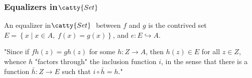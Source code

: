 \documentclass[]{article}
\newcommand{\setn}[1]{\left\{#1\right\}}
\newcommand{\tfarr}[4][\to]{\ensuremath{#2 : #3 #1 #4}}
\newcommand{\cat}[1]{\ensuremath{\!\! \catty{#1} \,\,}}
\begin{document}
\subsubsection{Equalizers in \cat{Set}}

An equalizer in \cat{Set} between $f$ and $g$ is the contrived set $E =
\setn{x\;|\; x \in A,\;f(x) = g(x)}$, and \tfarr[\hookrightarrow]{e}{E}{A}.

 "Since if $fh(z) = gh(z)$ for some
\tfarr{h}{Z}{A}, then $h(z) \in E$ for all $z \in Z$, whence $h$ "factors
through" the inclusion function $i$, in the sense that there is a function
\tfarr{\bar{h}}{Z}{E} such that $i\circ\bar{h} = h$."
\end{document}
